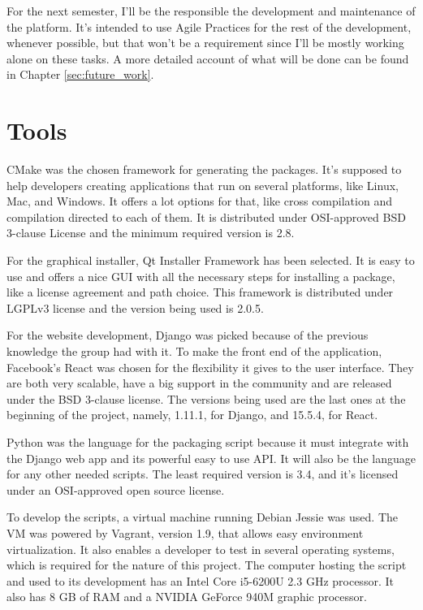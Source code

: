 For the next semester, I'll be the responsible the development and maintenance of the platform. It's intended to use Agile Practices for the rest of the development, whenever possible, but that won't be a requirement since I'll be mostly working alone on these tasks. A more detailed account of what will be done can be found in Chapter \ref{sec:future_work}.


\section{Tools}
\label{sec:tools}

CMake was the chosen framework for generating the packages. It's supposed to help developers creating applications that run on several platforms, like Linux, Mac, and Windows. It offers a lot options for that, like cross compilation and compilation directed to each of them. It is distributed under OSI-approved BSD 3-clause License and the minimum required version is 2.8.

For the graphical installer, Qt Installer Framework has been selected. It is easy to use and offers a nice GUI with all the necessary steps for installing a package, like a license agreement and path choice. This framework is distributed under LGPLv3 license and the version being used is 2.0.5.

For the website development, Django was picked because of the previous knowledge the group had with it. To make the front end of the application, Facebook's React was chosen for the flexibility it gives to the user interface. They are both very scalable, have a big support in the community and are released under the BSD 3-clause license. The versions being used are the last ones at the beginning of the project, namely, 1.11.1, for Django, and 15.5.4, for React.

Python was the language for the packaging script because it must integrate with the Django web app and its powerful easy to use API. It will also be the language for any other needed scripts. The least required version is 3.4, and it's licensed under an OSI-approved open source license.

To develop the scripts, a virtual machine running Debian Jessie was used. The VM was powered by Vagrant, version 1.9, that allows easy environment virtualization. It also enables a developer to test in several operating systems, which is required for the nature of this project. The computer hosting the script and used to its development has an Intel Core i5-6200U 2.3 GHz processor. It also has 8 GB of RAM and a NVIDIA GeForce 940M graphic processor.

